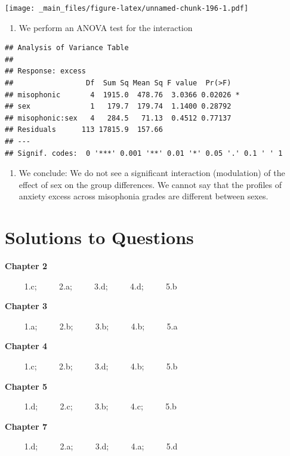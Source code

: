 \documentclass[
]{book}
\providecommand{\tightlist}{%
  \setlength{\itemsep}{0pt}\setlength{\parskip}{0pt}}
\begin{document}
\texttt{[image: \_main\_files/figure-latex/unnamed-chunk-196-1.pdf]}

\begin{enumerate}
\def\labelenumi{\alph{enumi}.}
\setcounter{enumi}{1}
\tightlist
\item
  We perform an ANOVA test for the interaction
\end{enumerate}

\begin{verbatim}
## Analysis of Variance Table
## 
## Response: excess
##                 Df  Sum Sq Mean Sq F value  Pr(>F)  
## misophonic       4  1915.0  478.76  3.0366 0.02026 *
## sex              1   179.7  179.74  1.1400 0.28792  
## misophonic:sex   4   284.5   71.13  0.4512 0.77137  
## Residuals      113 17815.9  157.66                  
## ---
## Signif. codes:  0 '***' 0.001 '**' 0.01 '*' 0.05 '.' 0.1 ' ' 1
\end{verbatim}

\begin{enumerate}
\def\labelenumi{\alph{enumi}.}
\setcounter{enumi}{2}
\tightlist
\item
  We conclude: We do not see a significant interaction (modulation) of the effect of sex on the group differences. We cannot say that the profiles of anxiety excess across misophonia grades are different between sexes.
\end{enumerate}

\hypertarget{solutions-to-questions}{%
\chapter{Solutions to Questions}\label{solutions-to-questions}}

\textbf{Chapter 2}

\(\qquad\) 1.c; \(\qquad\) 2.a; \(\qquad\) 3.d; \(\qquad\) 4.d; \(\qquad\) 5.b

\textbf{Chapter 3}

\(\qquad\) 1.a; \(\qquad\) 2.b; \(\qquad\) 3.b; \(\qquad\) 4.b; \(\qquad\) 5.a

\textbf{Chapter 4}

\(\qquad\) 1.c; \(\qquad\) 2.b; \(\qquad\) 3.d; \(\qquad\) 4.b; \(\qquad\) 5.b

\textbf{Chapter 5}

\(\qquad\) 1.d; \(\qquad\) 2.c; \(\qquad\) 3.b; \(\qquad\) 4.c; \(\qquad\) 5.b

\textbf{Chapter 7}

\(\qquad\) 1.d; \(\qquad\) 2.a; \(\qquad\) 3.d; \(\qquad\) 4.a; \(\qquad\) 5.d
\end{document}
